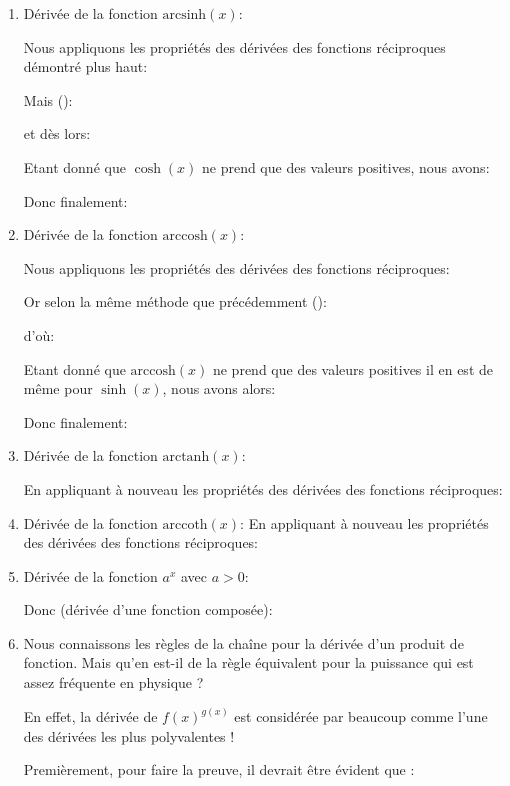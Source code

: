 \begin{enumerate}
		 	
		 	\item Dérivée de la fonction $\text{arcsinh}(x)$:
		 	
		 	Nous appliquons les propriétés des dérivées des fonctions réciproques démontré plus haut:
		 	
		 	Mais ():
		 	
		 	et dès lors:
		 	
		 	Etant donné que $\cosh(x)$ ne prend que des valeurs positives, nous avons:
		 	
		 	Donc finalement:
		 	
		 	
		 	\item Dérivée de la fonction $\text{arccosh}(x)$:
		 	
		 	Nous appliquons les propriétés des dérivées des fonctions réciproques:
		 	
		 	Or selon la même méthode que précédemment ():
		 	
		 	d'où: 
		 	
		 	Etant donné que $\text{arccosh}(x)$ ne prend que des valeurs positives il en est de même pour $\sinh(x)$, nous avons alors:
		 	
		 	Donc finalement:
		 	
		 	
		 	\item Dérivée de la fonction $\text{arctanh}(x)$:
		 	
		 	En appliquant à nouveau les propriétés des dérivées des fonctions réciproques:
		 	
		 	
		 	\item Dérivée de la fonction  $\text{arccoth}(x)$:
		 	En appliquant à nouveau les propriétés des dérivées des fonctions réciproques:
		 	
		 	
		 	\item Dérivée de la fonction $a^x$ avec $a>0$:
		 	
		 	Donc (dérivée d'une fonction composée):
		 	
		 	
		 	\item Nous connaissons les règles de la chaîne pour la dérivée d'un produit de fonction. Mais qu'en est-il de la règle équivalent pour la puissance qui est assez fréquente en physique ?
	
			En effet, la dérivée de $f(x)^{g(x)}$ est considérée par beaucoup comme l'une des dérivées les plus polyvalentes !
			
			Premièrement, pour faire la preuve, il devrait être évident que :
			

\end{enumerate}
